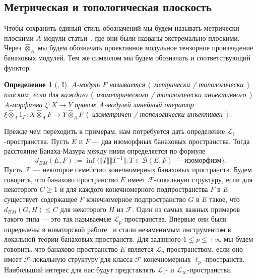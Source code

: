 \documentclass[12pt]{article}
\newcommand{\projmodtens}[1]{\mathbin{\widehat{\otimes}}_{#1}}
\newtheorem{definition}[theorem]{Определение}
\begin{document}
\subsection{Метрическая и топологическая
    плоскость}\label{SubSectionMetricAndTopologicalFlatness}

Чтобы сохранить единый стиль обозначений мы будем называть метрически плоскими
$A$-модули статьи~\cite{HelMetrFlatNorMod}, где они были названы экстремально
плоскими. Через $\projmodtens{A}$ мы будем обозначать проективное модульное
тензорное произведение банаховых модулей. Тем же символом мы будем обозначать и
соответствующий функтор.

\begin{definition}[\cite{HelMetrFlatNorMod}, I]\label{MetTopFlatMod} $A$-модуль
    $F$ называется $\langle$~метрически / топологически~$\rangle$ плоским, если
    для каждого $\langle$~изометрического / топологически инъективного~$\rangle$
    $A$-морфизма $\xi:X\to Y$ правых $A$-модулей линейный оператор
    $\xi\projmodtens{A} 1_F:X\projmodtens{A} F\to Y\projmodtens{A} F$
    $\langle$~изометричен / топологически инъективен~$\rangle$.
\end{definition}

Прежде чем переходить к примерам, нам потребуется дать определение
$\mathscr{L}_1$-пространства. Пусть $E$ и $F$ --- два изоморфных банаховых
пространства. Тогда расстояние Банаха-Мазура между ними определяется по формуле
$$
    d_{BM}(E,F):=\inf \{\Vert T\Vert\Vert T^{-1}\Vert
    : T \in \mathcal{B}(E,F) \mbox{ --- изоморфизм} \}.
$$
Пусть $\mathcal{F}$ --- некоторое семейство конечномерных банаховых пространств.
Будем говорить, что банахово пространство $E$ имеет $\mathcal{F}$-локальную
структуру, если для некоторого $C\geq 1$ и для каждого конечномерного
подпространства $F$ в $E$ существует содержащее $F$ конечномерное
подпространство $G$ в $E$ такое, что $d_{BM}(G,H)\leq C$ для некоторого $H$ из
$\mathcal{F}$. Один из самых важных примеров такого типа --- это так называемые
$\mathscr{L}_p$-пространства. Впервые они были определены в новаторской
работе~\cite{LinPelAbsSumOpInLpSpAndApp} и стали незаменимым инструментом в
локальной теории банаховых пространств. Для заданного $1\leq p\leq +\infty$ мы
будем говорить, что банахово пространство $E$ является
$\mathscr{L}_p$-пространством, если оно имеет $\mathcal{F}$-локальную структуру
для класса $\mathcal{F}$ конечномерных $\ell_p$-пространств. Наибольший интерес
для нас будут представлять $\mathscr{L}_1$- и $\mathscr{L}_\infty$-пространства.
\end{document}
